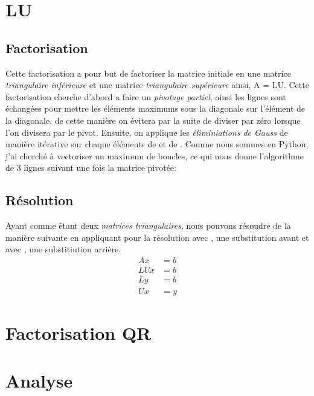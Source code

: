 \documentclass{article}[11pt]
\begin{document}
\mytitle
\section{LU}
\subsection{Factorisation}

Cette factorisation a pour but de factoriser la matrice initiale  en une matrice \textit{triangulaire inférieure}  et une matrice \textit{triangulaire supérieure}  ainsi, {A = LU}.
Cette factorisation cherche d'abord a faire un \textit{pivotage partiel}, ainsi les lignes sont échangées pour mettre les éléments maximums sous la diagonale sur l'élément de la diagonale, de cette manière on évitera par la suite de diviser par zéro lorsque l'on divisera par le pivot. Ensuite, on applique les \textit{éliminiations de Gauss} de manière itérative sur chaque éléments de  et de . Comme nous sommes en Python, j'ai cherché à vectoriser un maximum de boucles, ce qui nous donne l'algorithme de 3 lignes suivant une fois la matrice pivotée:

\subsection{Résolution}

Ayant  comme étant deux \textit{matrices triangulaires}, nous pouvons résoudre de la manière suivante en appliquant pour la résolution avec , une substitution avant et avec , une substitiution arrière.
\begin{align*}
    Ax&=b \\
    LUx&=b \\
    Ly&=b \\
    Ux&=y
\end{align*}

\section{Factorisation QR}

\section{Analyse}
\end{document}
